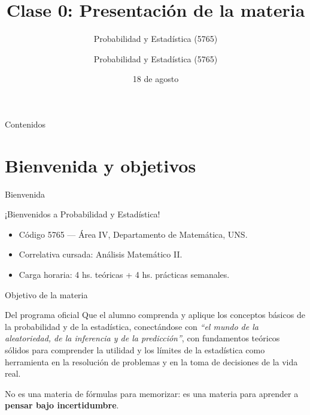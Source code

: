 \documentclass[aspectratio=169,11pt]{beamer}
\title[Prob. y Estadística]{Clase 0: Presentación de la materia}
\subtitle{Probabilidad y Estadística (5765)}
\institute[UNS]{Universidad Nacional del Sur \\ Departamento de Matemática}
\author{Probabilidad y Estadística (5765)}
\date{18 de agosto}
\begin{document}
\begin{frame}
\titlepage
\end{frame}

\begin{frame}{Contenidos}
\tableofcontents
\end{frame}

\section{Bienvenida y objetivos}

\begin{frame}{Bienvenida}
\begin{center}
\Large ¡Bienvenidos a Probabilidad y Estadística!
\end{center}
\vspace{0.8em}
\begin{itemize}
\item Código 5765 — Área IV, Departamento de Matemática, UNS.
\item Correlativa cursada: Análisis Matemático II.
\item Carga horaria: 4 hs. teóricas + 4 hs. prácticas semanales.
\end{itemize}
\end{frame}

\begin{frame}{Objetivo de la materia}
\begin{block}{Del programa oficial}
Que el alumno comprenda y aplique los conceptos básicos de la probabilidad y de la estadística, conectándose con \emph{``el mundo de la aleatoriedad, de la inferencia y de la predicción''}, con fundamentos teóricos sólidos para comprender la utilidad y los límites de la estadística como herramienta en la resolución de problemas y en la toma de decisiones de la vida real.
\end{block}

\vspace{0.5em}
No es una materia de fórmulas para memorizar: es una materia para aprender a \textbf{pensar bajo incertidumbre}.
\end{frame}
\end{document}
